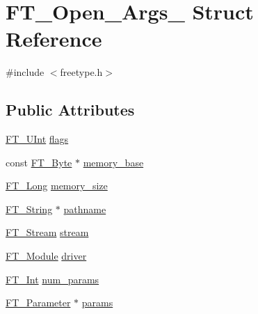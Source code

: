 \hypertarget{struct_f_t___open___args__}{\section{F\-T\-\_\-\-Open\-\_\-\-Args\-\_\- Struct Reference}
\label{struct_f_t___open___args__}
}


{\ttfamily \#include $<$freetype.\-h$>$}

\subsection*{Public Attributes}
\begin{DoxyCompactItemize}
\item 
\hyperlink{fttypes_8h_abcb8db4dbf35d2b55a9e8c7b0926dc52}{F\-T\-\_\-\-U\-Int} \hyperlink{struct_f_t___open___args___a2e3e6b9284fe8b4d9833e247a19181fa}{flags}
\item 
const \hyperlink{fttypes_8h_a51f26183ca0c9f4af958939648caeccd}{F\-T\-\_\-\-Byte} $\ast$ \hyperlink{struct_f_t___open___args___a1231da51bc58922096b3bc603bb2ffb0}{memory\-\_\-base}
\item 
\hyperlink{fttypes_8h_a7fa72a1f0e79fb1860c5965789024d6f}{F\-T\-\_\-\-Long} \hyperlink{struct_f_t___open___args___a87f0bb2f257abe94c93a79e0de3525da}{memory\-\_\-size}
\item 
\hyperlink{fttypes_8h_a9846214585359eb2ba6bbb0e6de30639}{F\-T\-\_\-\-String} $\ast$ \hyperlink{struct_f_t___open___args___aea3d454d9fd9bb7434aad07e651d027b}{pathname}
\item 
\hyperlink{ftsystem_8h_a788b32c932932f7411a8dfa7f6c794bf}{F\-T\-\_\-\-Stream} \hyperlink{struct_f_t___open___args___ae1e6444bf0c21b323ce6cbe8bc475b2b}{stream}
\item 
\hyperlink{freetype_8h_a660c1bb333747abacdc433b7d73ca59b}{F\-T\-\_\-\-Module} \hyperlink{struct_f_t___open___args___a7c01bd7e34a440c3e89141ee521e2646}{driver}
\item 
\hyperlink{fttypes_8h_af90e5fb0d07e21be9fe6faa33f02484c}{F\-T\-\_\-\-Int} \hyperlink{struct_f_t___open___args___afaf47d9e1631f2147b696fd7f5a6f4eb}{num\-\_\-params}
\item 
\hyperlink{freetype_8h_a0b96ed5cf9b897c90409981c43633d55}{F\-T\-\_\-\-Parameter} $\ast$ \hyperlink{struct_f_t___open___args___a77b279a34beba29bc14901926f79818f}{params}
\end{DoxyCompactItemize}


